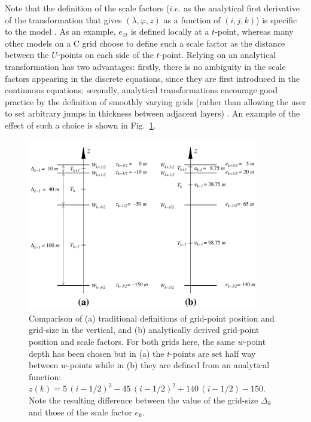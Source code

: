 Note that the definition of the scale factors ($i.e.$ as the analytical first derivative 
of the transformation that gives $(\lambda,\varphi,z)$ as a function of $(i,j,k)$) is 
specific to the \NEMO model \citep{Marti_al_JGR92}. As an example, $e_{1t}$ is defined 
locally at a $t$-point, whereas many other models on a C grid choose to define 
such a scale factor as the distance between the $U$-points on each side of the 
$t$-point. Relying on an analytical transformation has two advantages: firstly, there 
is no ambiguity in the scale factors appearing in the discrete equations, since they 
are first introduced in the continuous equations; secondly, analytical transformations 
encourage good practice by the definition of smoothly varying grids (rather than 
allowing the user to set arbitrary jumps in thickness between adjacent layers) 
\citep{Treguier1996}. An example of the effect of such a choice is shown in 
Fig.~\ref{Fig_zgr_e3}.
\begin{figure}[!t]     \begin{center}
\includegraphics[width=0.90\textwidth]{./TexFiles/Figures/Fig_zgr_e3.pdf}
\caption{ \label{Fig_zgr_e3}    
Comparison of (a) traditional definitions of grid-point position and grid-size in the vertical, 
and (b) analytically derived grid-point position and scale factors. 
For both grids here,  the same $w$-point depth has been chosen but in (a) the 
$t$-points are set half way between $w$-points while in (b) they are defined from 
an analytical function: $z(k)=5\,(i-1/2)^3 - 45\,(i-1/2)^2 + 140\,(i-1/2) - 150$. 
Note the resulting difference between the value of the grid-size $\Delta_k$ and 
those of the scale factor $e_k$. }
\end{center}   \end{figure}

